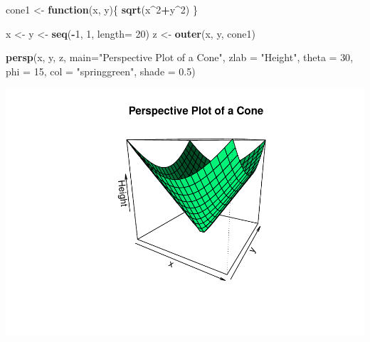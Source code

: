 \documentclass[
]{article}
\newenvironment{Shaded}{\begin{snugshade}}{\end{snugshade}}
\newcommand{\AttributeTok}[1]{\textcolor[rgb]{0.13,0.29,0.53}{#1}}
\newcommand{\ControlFlowTok}[1]{\textcolor[rgb]{0.13,0.29,0.53}{\textbf{#1}}}
\newcommand{\DecValTok}[1]{\textcolor[rgb]{0.00,0.00,0.81}{#1}}
\newcommand{\FloatTok}[1]{\textcolor[rgb]{0.00,0.00,0.81}{#1}}
\newcommand{\FunctionTok}[1]{\textcolor[rgb]{0.13,0.29,0.53}{\textbf{#1}}}
\newcommand{\NormalTok}[1]{#1}
\newcommand{\OtherTok}[1]{\textcolor[rgb]{0.56,0.35,0.01}{#1}}
\newcommand{\SpecialCharTok}[1]{\textcolor[rgb]{0.81,0.36,0.00}{\textbf{#1}}}
\newcommand{\StringTok}[1]{\textcolor[rgb]{0.31,0.60,0.02}{#1}}
\begin{document}
\begin{Shaded}
\begin{Highlighting}[]
\NormalTok{cone1 }\OtherTok{\textless{}{-}} \ControlFlowTok{function}\NormalTok{(x, y)\{}
\FunctionTok{sqrt}\NormalTok{(x}\SpecialCharTok{\^{}}\DecValTok{2}\SpecialCharTok{+}\NormalTok{y}\SpecialCharTok{\^{}}\DecValTok{2}\NormalTok{)}
\NormalTok{\}}

\NormalTok{x }\OtherTok{\textless{}{-}}\NormalTok{ y }\OtherTok{\textless{}{-}} \FunctionTok{seq}\NormalTok{(}\SpecialCharTok{{-}}\DecValTok{1}\NormalTok{, }\DecValTok{1}\NormalTok{, }\AttributeTok{length=} \DecValTok{20}\NormalTok{)}
\NormalTok{z }\OtherTok{\textless{}{-}} \FunctionTok{outer}\NormalTok{(x, y, cone1)}

\FunctionTok{persp}\NormalTok{(x, y, z,}
\AttributeTok{main=}\StringTok{"Perspective Plot of a Cone"}\NormalTok{,}
\AttributeTok{zlab =} \StringTok{"Height"}\NormalTok{,}
\AttributeTok{theta =} \DecValTok{30}\NormalTok{, }\AttributeTok{phi =} \DecValTok{15}\NormalTok{,}
\AttributeTok{col =} \StringTok{"springgreen"}\NormalTok{, }\AttributeTok{shade =} \FloatTok{0.5}\NormalTok{)}
\end{Highlighting}
\end{Shaded}

\includegraphics{week1_files/figure-latex/unnamed-chunk-3-1.pdf}
\end{document}
